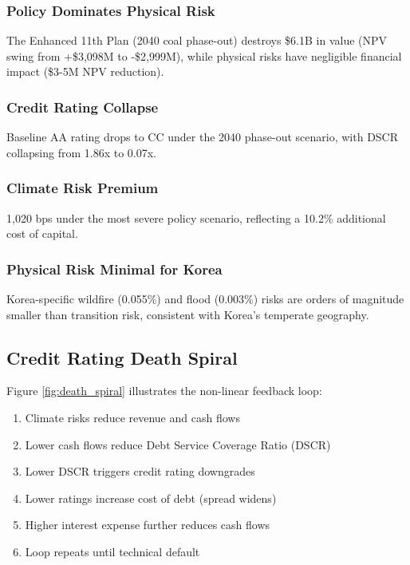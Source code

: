 \documentclass[11pt,a4paper]{article}
\begin{document}
\subsubsection{Policy Dominates Physical Risk}
The Enhanced 11th Plan (2040 coal phase-out) destroys \$6.1B in value (NPV swing from +\$3,098M to -\$2,999M), while physical risks have negligible financial impact (\$3-5M NPV reduction).

\subsubsection{Credit Rating Collapse}
Baseline AA rating drops to CC under the 2040 phase-out scenario, with DSCR collapsing from 1.86x to 0.07x.

\subsubsection{Climate Risk Premium}
1,020 bps under the most severe policy scenario, reflecting a 10.2\% additional cost of capital.

\subsubsection{Physical Risk Minimal for Korea}
Korea-specific wildfire (0.055\%) and flood (0.003\%) risks are orders of magnitude smaller than transition risk, consistent with Korea's temperate geography.

\subsection{Credit Rating Death Spiral}

Figure \ref{fig:death_spiral} illustrates the non-linear feedback loop:

\begin{enumerate}
\item Climate risks reduce revenue and cash flows
\item Lower cash flows reduce Debt Service Coverage Ratio (DSCR)
\item Lower DSCR triggers credit rating downgrades
\item Lower ratings increase cost of debt (spread widens)
\item Higher interest expense further reduces cash flows
\item Loop repeats until technical default
\end{enumerate}
\end{document}
